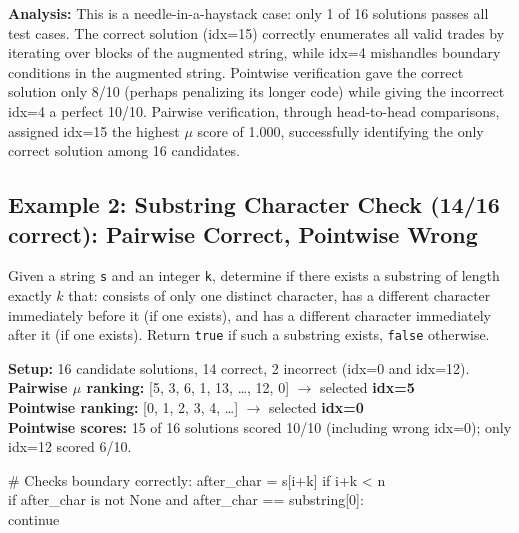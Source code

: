 \noindent\textbf{Analysis:} This is a needle-in-a-haystack case: only 1 of 16 solutions passes all test cases. The correct solution (idx=15) correctly enumerates all valid trades by iterating over blocks of the augmented string, while idx=4 mishandles boundary conditions in the augmented string. Pointwise verification gave the correct solution only 8/10 (perhaps penalizing its longer code) while giving the incorrect idx=4 a perfect 10/10. Pairwise verification, through head-to-head comparisons, assigned idx=15 the highest $\mu$ score of 1.000, successfully identifying the only correct solution among 16 candidates.


\subsection{Example 2: Substring Character Check (14/16 correct): Pairwise Correct, Pointwise Wrong}

\begin{tcolorbox}[
    colback=promptbg,
    colframe=promptborder,
    title={\textbf{Problem: Check for special substring of length $k$}},
    coltitle=white,
    fonttitle=\small\bfseries,
    breakable,
    enhanced
]
\small
Given a string \texttt{s} and an integer \texttt{k}, determine if there exists a substring of length exactly $k$ that: consists of only one distinct character, has a different character immediately before it (if one exists), and has a different character immediately after it (if one exists). Return \texttt{true} if such a substring exists, \texttt{false} otherwise.
\end{tcolorbox}

\noindent\textbf{Setup:} 16 candidate solutions, 14 correct, 2 incorrect (idx=0 and idx=12).\\
\textbf{Pairwise $\mu$ ranking:} [5, 3, 6, 1, 13, \ldots, 12, 0] $\rightarrow$ selected \textbf{idx=5} \checkmark\\
\textbf{Pointwise ranking:} [0, 1, 2, 3, 4, \ldots] $\rightarrow$ selected \textbf{idx=0} \\
\textbf{Pointwise scores:} 15 of 16 solutions scored 10/10 (including wrong idx=0); only idx=12 scored 6/10.

\begin{tcolorbox}[
    colback=green!5,
    colframe=green!60!black,
    title={\textbf{Pairwise-Selected Solution (idx=5): Correct \checkmark}},
    coltitle=white,
    fonttitle=\small\bfseries,
    breakable,
    enhanced
]
\small\ttfamily
\# Checks boundary correctly: after\_char = s[i+k] if i+k < n\\
if after\_char is not None and after\_char == substring[0]:\\
\quad continue
\end{tcolorbox}

